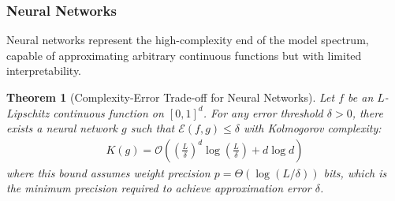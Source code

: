 \documentclass[11pt,letter,leqno]{article}
\newtheorem{theorem}{Theorem}[section]
\begin{document}
\subsubsection{Neural Networks}
\label{subsubsec:neural-networks}

Neural networks represent the high-complexity end of the model spectrum, capable of approximating arbitrary continuous functions but with limited interpretability.

\begin{theorem}[Complexity-Error Trade-off for Neural Networks]
\label{thm:neural-network}
Let $f$ be an $L$-Lipschitz continuous function on $[0, 1]^d$. For any error threshold $\delta > 0$, there exists a neural network $g$ such that $\mathcal{E}(f, g) \leq \delta$ with Kolmogorov complexity:
\begin{align}
K(g) = \mathcal{O}\left(\left(\frac{L}{\delta}\right)^d \log\left(\frac{L}{\delta}\right) + d \log d\right)
\end{align}
where this bound assumes weight precision $p = \Theta(\log(L/\delta))$ bits, which is the minimum precision required to achieve approximation error $\delta$.
\end{theorem}
\end{document}
